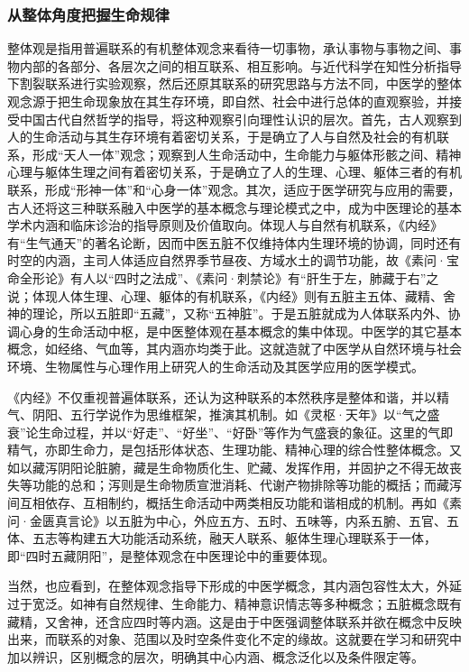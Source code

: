 \documentclass[draft,12pt]{ctexbook}
\begin{document}
\subsubsection{从整体角度把握生命规律}%

整体观是指用普遍联系的有机整体观念来看待一切事物，承认事物与事物之间、事物内部的各部分、各层次之间的相互联系、相互影响。与近代科学在知性分析指导下割裂联系进行实验观察，然后还原其联系的研究思路与方法不同，中医学的整体观念源于把生命现象放在其生存环境，即自然、社会中进行总体的直观察验，并接受中国古代自然哲学的指导，将这种观察引向理性认识的层次。首先，古人观察到人的生命活动与其生存环境有着密切关系，于是确立了人与自然及社会的有机联系，形成“天人一体”观念；观察到人生命活动中，生命能力与躯体形骸之间、精神心理与躯体生理之间有着密切关系，于是确立了人的生理、心理、躯体三者的有机联系，形成“形神一体”和“心身一体”观念。其次，适应于医学研究与应用的需要，古人还将这三种联系融入中医学的基本概念与理论模式之中，成为中医理论的基本学术内涵和临床诊治的指导原则及价值取向。体现人与自然有机联系，《内经》有“生气通天”的著名论断，因而中医五脏不仅维持体内生理环境的协调，同时还有时空的内涵，主司人体适应自然界季节昼夜、方域水土的调节功能，故《素问·宝命全形论》有人以“四时之法成”、《素问·刺禁论》有“肝生于左，肺藏于右”之说；体现人体生理、心理、躯体的有机联系，《内经》则有五脏主五体、藏精、舍神的理论，所以五脏即“五藏”，又称“五神脏”。于是五脏就成为人体联系内外、协调心身的生命活动中枢，是中医整体观在基本概念的集中体现。中医学的其它基本概念，如经络、气血等，其内涵亦均类于此。这就造就了中医学从自然环境与社会环境、生物属性与心理作用上研究人的生命活动及其医学应用的医学模式。

《内经》不仅重视普遍体联系，还认为这种联系的本然秩序是整体和谐，并以精气、阴阳、五行学说作为思维框架，推演其机制。如《灵枢·天年》以“气之盛衰”论生命过程，并以“好走”、“好坐”、“好卧”等作为气盛衰的象征。这里的气即精气，亦即生命力，是包括形体状态、生理功能、精神心理的综合性整体概念。又如以藏泻阴阳论脏腑，藏是生命物质化生、贮藏、发挥作用，并固护之不得无故丧失等功能的总和；泻则是生命物质宣泄消耗、代谢产物排除等功能的概括；而藏泻间互相依存、互相制约，概括生命活动中两类相反功能和谐相成的机制。再如《素问·金匮真言论》以五脏为中心，外应五方、五时、五味等，内系五腑、五官、五体、五志等构建五大功能活动系统，融天人联系、躯体生理心理联系于一体，即“四时五藏阴阳”，是整体观念在中医理论中的重要体现。

当然，也应看到，在整体观念指导下形成的中医学概念，其内涵包容性太大，外延过于宽泛。如神有自然规律、生命能力、精神意识情志等多种概念；五脏概念既有藏精，又舍神，还含应四时等内涵。这是由于中医强调整体联系并欲在概念中反映出来，而联系的对象、范围以及时空条件变化不定的缘故。这就要在学习和研究中加以辨识，区别概念的层次，明确其中心内涵、概念泛化以及条件限定等。
\end{document}
